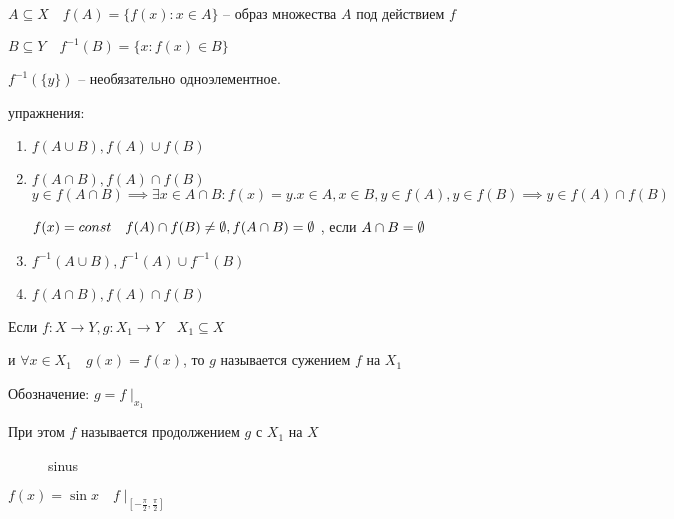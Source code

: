     $A\subseteq X\quad f(A) = \{f(x): x\in A\}$ -- образ множества $A$ под действием $f$

    $B\subseteq Y\quad f^{-1}(B) = \{x:f(x)\in B\}$

    $f^{-1}(\{y\})$ -- необязательно одноэлементное.


упражнения:
\begin{enumerate}
    \item $f(A\cup B), f(A)\cup f(B) $
    \item $f(A\cap B), f(A) \cap f(B)
$
        $y\in f(A\cap B) \implies  \exists x\in A\cap B:f(x) = y. x\in A, x\in B, y\in f(A), y\in f(B) \implies  y\in f(A)\cap f(B)$

        $f(x) = const\quad f(A)\cap f(B)\neq \emptyset , f(A\cap B) = \emptyset$ , если $A\cap B = \emptyset $
    \item $f^{-1}(A\cup B), f^{-1}(A)\cup f^{-1}(B)$
    \item $f(A\cap B), f(A) \cap f(B)$
\end{enumerate}

\begin{definition}
    Если $f:X\to Y, g:X_1\to Y\quad X_1\subseteq X $

    и $\forall x\in X_1 \quad g(x) = f(x)$, то $g$ называется сужением $f$ на $X_1$

    Обозначение: $g = f\mid_{x_1}$

    При этом $f$ называется продолжением $g$ с $X_1$ на $X$
\end{definition}

\begin{figure}[h]
    \centering
    \caption{sinus}
    \label{sinus}
\end{figure}

\begin{example}
    $f(x) = \sin x\quad f\mid_{[-\frac{\pi}{2}, \frac{\pi}{2}]}$
    
\end{example}
   
